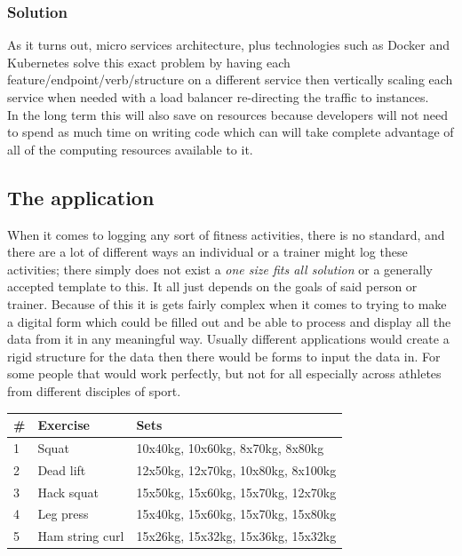 \documentclass{article}
\newcommand{\vspaceconst}{-2ex}
\begin{document}
\begin{multicols}{2}
\subsubsection{Solution}
\vspace{\vspaceconst}
As it turns out, micro services architecture, plus technologies such as Docker and Kubernetes solve this exact problem by having each feature/endpoint/verb/structure on a different service then vertically scaling each service when needed with a load balancer re-directing the traffic to instances.\\
In the long term this will also save on resources because developers will not need to spend as much time on writing code which can will take complete advantage of all of the computing resources available to it.\\

\subsection{The application}
\vspace{\vspaceconst}

When it comes to logging any sort of fitness activities, there is no standard, and there are a lot of different ways an individual or a trainer might log these activities; there simply does not exist a \textit{one size fits all solution} or a generally accepted template to this. It all just depends on the goals of said person or trainer. Because of this it is gets fairly complex when it comes to trying to make a digital form which could be filled out and be able to process and display all the data from it in any meaningful way. Usually different applications would create a rigid structure for the data then there would be forms to input the data in. For some people that would work perfectly, but not for all especially across athletes from different disciples of sport.\\

\begingroup
\centering
\begin{tabular}{l l p{3cm}}
  \toprule
  \# & Exercise & Sets \\ [0.5ex]
  \midrule
  1 & Squat & 10x40kg, 10x60kg, 8x70kg, 8x80kg\\
  \midrule
  2 & Dead lift & 12x50kg, 12x70kg, 10x80kg, 8x100kg\\
  \midrule
  3 & Hack squat & 15x50kg, 15x60kg, 15x70kg, 12x70kg\\
  \midrule
  4 & Leg press & 15x40kg, 15x60kg, 15x70kg, 15x80kg\\
  \midrule
  5 & Ham string curl & 15x26kg, 15x32kg, 15x36kg, 15x32kg\\
  \bottomrule
\end{tabular}
~\label{table:WorkoutLogExample1}
\endgroup


\end{multicols}
\end{document}
